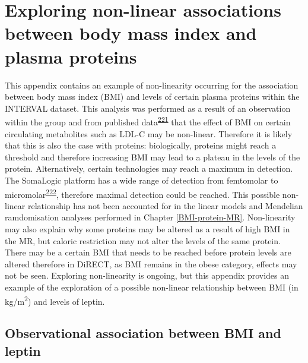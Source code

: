 \documentclass[11pt,twoside]{bristolthesis}
\begin{document}
\hypertarget{Appendix-A}{%
\chapter{Exploring non-linear associations between body mass index and plasma proteins}\label{Appendix-A}}

This appendix contains an example of non-linearity occurring for the association between body mass index (BMI) and levels of certain plasma proteins within the INTERVAL dataset. This analysis was performed as a result of an observation within the group and from published data\textsuperscript{\protect\hyperlink{ref-Li2021}{221}} that the effect of BMI on certain circulating metabolites such as LDL-C may be non-linear. Therefore it is likely that this is also the case with proteins: biologically, proteins might reach a threshold and therefore increasing BMI may lead to a plateau in the levels of the protein. Alternatively, certain technologies may reach a maximum in detection. The SomaLogic platform has a wide range of detection from femtomolar to micromolar\textsuperscript{\protect\hyperlink{ref-Lim2017}{222}}, therefore maximal detection could be reached. This possible non-linear relationship has not been accounted for in the linear models and Mendelian ramdomisation analyses performed in Chapter \ref{BMI-protein-MR}. Non-linearity may also explain why some proteins may be altered as a result of high BMI in the MR, but caloric restriction may not alter the levels of the same protein. There may be a certain BMI that needs to be reached before protein levels are altered therefore in DiRECT, as BMI remains in the obese category, effects may not be seen. Exploring non-linearity is ongoing, but this appendix provides an example of the exploration of a possible non-linear relationship between BMI (in kg/m\textsuperscript{2}) and levels of leptin.

\hypertarget{observational-association-between-bmi-and-leptin}{%
\section{Observational association between BMI and leptin}\label{observational-association-between-bmi-and-leptin}}
\end{document}
